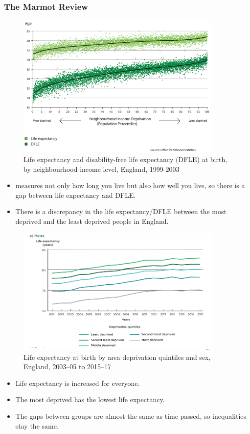         \subsubsection{The Marmot Review}
            \begin{figure}[H]
                \centering
                \includegraphics[width=4in]{images/ch3/28.png}
                \caption{Life expectancy and disability-free life expectancy (DFLE) at birth, by neighbourhood income level, England, 1999-2003}
            \end{figure}
            \begin{itemize}
                    \item {} measures not only how long you live but also how well you live, so there is a gap between life expectancy and DFLE.
                    \item There is a discrepancy in the life expectancy/DFLE between the most deprived and the least deprived people in England.
            \end{itemize} 
        
            \begin{figure}[H]
                \centering
                \includegraphics[width=4in]{images/ch3/29.png}
                \caption{Life expectancy at birth by area deprivation quintiles and sex, England, 2003–05 to 2015–17}
            \end{figure}
            \begin{itemize}
                \item Life expectancy is increased for everyone.
                \item The most deprived has the lowest life expectancy.
                \item The gaps between groups are almost the same as time passed, so inequalities stay the same.
            \end{itemize}
        
